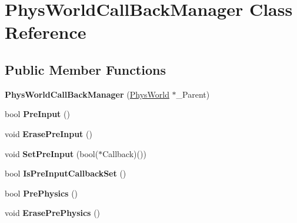 \hypertarget{classPhysWorldCallBackManager}{
\section{PhysWorldCallBackManager Class Reference}
\label{d4/d84/classPhysWorldCallBackManager}
}
\subsection*{Public Member Functions}
\begin{DoxyCompactItemize}
\item 
\hypertarget{classPhysWorldCallBackManager_a8c9c48f5f38894c992a7d9b305511fc5}{
{\bfseries PhysWorldCallBackManager} (\hyperlink{classPhysWorld}{PhysWorld} $\ast$\_\-Parent)}
\label{d4/d84/classPhysWorldCallBackManager_a8c9c48f5f38894c992a7d9b305511fc5}

\item 
\hypertarget{classPhysWorldCallBackManager_a10f1f1f43901a1f9abd81894c88adde1}{
bool {\bfseries PreInput} ()}
\label{d4/d84/classPhysWorldCallBackManager_a10f1f1f43901a1f9abd81894c88adde1}

\item 
\hypertarget{classPhysWorldCallBackManager_ade91162294b133a884d3cd3738837188}{
void {\bfseries ErasePreInput} ()}
\label{d4/d84/classPhysWorldCallBackManager_ade91162294b133a884d3cd3738837188}

\item 
\hypertarget{classPhysWorldCallBackManager_a7c998a308fa8ad1a32fdbf6418d5a996}{
void {\bfseries SetPreInput} (bool($\ast$Callback)())}
\label{d4/d84/classPhysWorldCallBackManager_a7c998a308fa8ad1a32fdbf6418d5a996}

\item 
\hypertarget{classPhysWorldCallBackManager_a1915942a4ed70cff4f445ce39df1f4ad}{
bool {\bfseries IsPreInputCallbackSet} ()}
\label{d4/d84/classPhysWorldCallBackManager_a1915942a4ed70cff4f445ce39df1f4ad}

\item 
\hypertarget{classPhysWorldCallBackManager_af6ff4d266c65c2e6e0c5dd990a7e90e7}{
bool {\bfseries PrePhysics} ()}
\label{d4/d84/classPhysWorldCallBackManager_af6ff4d266c65c2e6e0c5dd990a7e90e7}

\item 
\hypertarget{classPhysWorldCallBackManager_adc97e203f35b8e8929b29bf8d547f4ad}{
void {\bfseries ErasePrePhysics} ()}
\label{d4/d84/classPhysWorldCallBackManager_adc97e203f35b8e8929b29bf8d547f4ad}


\end{DoxyCompactItemize}
